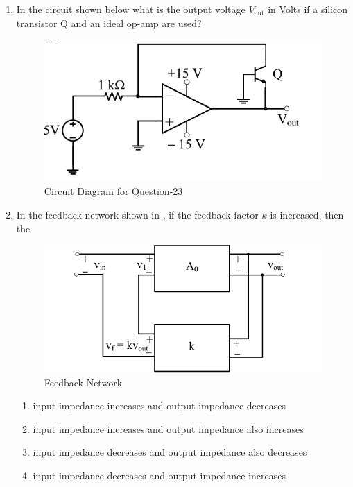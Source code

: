 \documentclass[journal,12pt,onecolumn]{IEEEtran}
\theoremstyle{remark}
\begin{document}
\begin{enumerate}
\item In the circuit shown below what is the output voltage $V_{\text{out}}$ in Volts if a silicon transistor Q and an ideal op-amp are used?  
\par \hfill{}
\begin{figure}[H]
\centering
\includegraphics[width=0.5\columnwidth]{Figs/Q-23.png}
\caption{Circuit Diagram for Question-23}
\label{23}
\end{figure}
\begin{enumerate}
\end{enumerate}

\item In the feedback network shown in , if the feedback factor $k$ is increased, then the  
\par \hfill{}
\begin{figure}[H]
    \centering
    \includegraphics[width=0.5\linewidth]{Figs/Q-24.png}
    \caption{Feedback Network}
    \label{24}
\end{figure}
\begin{enumerate}
\item input impedance increases and output impedance decreases
\item input impedance increases and output impedance also increases
\item input impedance decreases and output impedance also decreases
\item input impedance decreases and output impedance increases
\end{enumerate}


\end{enumerate}
\end{document}
